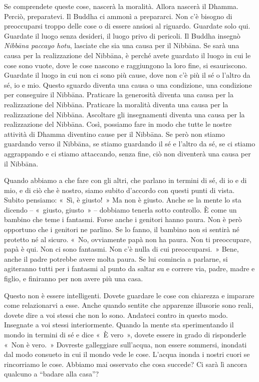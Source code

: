 Se comprendete queste cose, nascerà la moralità. Allora nascerà il
Dhamma. Perciò, preparatevi. Il Buddha ci ammonì a prepararci. Non c'è
bisogno di preoccuparsi troppo delle cose o di essere ansiosi al
riguardo. Guardate solo qui. Guardate il luogo senza desideri, il luogo
privo di pericoli. Il Buddha insegnò \emph{Nibbāna paccayo hotu},
lasciate che sia una causa per il Nibbāna. Se sarà una causa per
la realizzazione del Nibbāna, è perché avete guardato il luogo in
cui le cose sono vuote, dove le cose nascono e raggiungono la loro fine,
si esauriscono. Guardate il luogo in cui non ci sono più cause, dove non
c'è più il sé o l'altro da sé, io e mio. Questo sguardo diventa una
causa o una condizione, una condizione per conseguire il Nibbāna.
Praticare la generosità diventa una causa per la realizzazione del
Nibbāna. Praticare la moralità diventa una causa per la
realizzazione del Nibbāna. Ascoltare gli insegnamenti diventa una
causa per la realizzazione del Nibbāna. Così, possiamo fare in
modo che tutte le nostre attività di Dhamma diventino cause per il
Nibbāna. Se però non stiamo guardando verso il Nibbāna, se
stiamo guardando il sé e l'altro da sé, se ci stiamo aggrappando e ci
stiamo attaccando, senza fine, ciò non diventerà una causa per il
Nibbāna.

Quando abbiamo a che fare con gli altri, che parlano in termini di sé,
di io e di mio, e di ciò che è nostro, siamo subito d'accordo con questi
punti di vista. Subito pensiamo: «~Sì, è giusto!~» Ma non è giusto.
Anche se la mente lo sta dicendo -- «~giusto, giusto~» -- dobbiamo
tenerla sotto controllo. È come un bambino che teme i fantasmi. Forse
anche i genitori hanno paura. Non è però opportuno che i genitori ne
parlino. Se lo fanno, il bambino non si sentirà né protetto né al
sicuro. «~No, ovviamente papà non ha paura. Non ti preoccupare, papà è
qui. Non ci sono fantasmi. Non c'è nulla di cui preoccuparsi.~» Bene,
anche il padre potrebbe avere molta paura. Se lui comincia a parlarne,
si agiteranno tutti per i fantasmi al punto da saltar su e correre via,
padre, madre e figlio, e finiranno per non avere più una casa.

Questo non è essere intelligenti. Dovete guardare le cose con chiarezza
e imparare come relazionarvi a esse. Anche quando sentite che apparenze
illusorie sono reali, dovete dire a voi stessi che non lo sono. Andateci
contro in questo modo. Insegnate a voi stessi interiormente. Quando la
mente sta sperimentando il mondo in termini di sé e dice «~È vero~»,
dovete essere in grado di risponderle «~Non è vero.~» Dovreste
galleggiare sull'acqua, non essere sommersi, inondati dal modo consueto
in cui il mondo vede le cose. L'acqua inonda i nostri cuori se
rincorriamo le cose. Abbiamo mai osservato che cosa succede? Ci sarà lì
ancora qualcuno a ``badare alla casa''?

